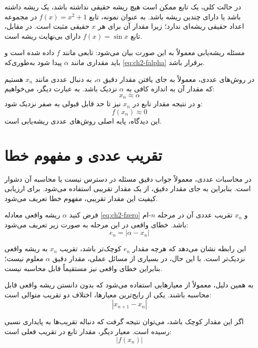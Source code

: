 در حالت کلی، یک تابع ممکن است هیچ ریشه حقیقی نداشته باشد، یک ریشه داشته باشد یا دارای چندین ریشه باشد. به عنوان نمونه، تابع $f(x)=x^2+1$ در مجموعه اعداد حقیقی ریشه‌ای ندارد؛ زیرا مقدار آن برای هر $x$ حقیقی مثبت است. در مقابل، تابع $f(x)=\sin x$ دارای بی‌نهایت ریشه است.

مسئله ریشه‌یابی معمولاً به این صورت بیان می‌شود: تابعی مانند $f$ داده شده است و باید مقداری مانند $\alpha$ پیدا شود به‌طوری‌که \eqref{eq:ch2-falpha} برقرار باشد.

در روش‌های عددی، معمولاً به جای یافتن مقدار دقیق $\alpha$، به دنبال عددی مانند $x_n$ هستیم که مقدار آن به اندازه کافی به $\alpha$ نزدیک باشد. به عبارت دیگر، می‌خواهیم:
\[
x_n \approx \alpha
\]
و در نتیجه مقدار تابع در $x_n$ نیز تا حد قابل قبولی به صفر نزدیک شود:
\[
f(x_n)\approx 0
\]
این دیدگاه، پایه اصلی روش‌های عددی ریشه‌یابی است.

\section{تقریب عددی و مفهوم خطا}

در محاسبات عددی، معمولاً جواب دقیق مسئله در دسترس نیست یا محاسبه آن دشوار است. بنابراین به جای مقدار دقیق، از یک مقدار تقریبی استفاده می‌شود. برای ارزیابی کیفیت این مقدار تقریبی، مفهوم خطا تعریف می‌شود.

فرض کنید $\alpha$ ریشه واقعی معادله \eqref{eq:ch2-fzero} و $x_n$ تقریب عددی آن در مرحله $n$-ام باشد. خطای واقعی در این مرحله به صورت زیر تعریف می‌شود:
\begin{equation}
e_n = |\alpha - x_n|
\label{eq:ch2-abs-error}
\end{equation}

این رابطه نشان می‌دهد که هرچه مقدار $e_n$ کوچک‌تر باشد، تقریب $x_n$ به ریشه واقعی نزدیک‌تر است. با این حال، در بسیاری از مسائل عملی، مقدار دقیق $\alpha$ معلوم نیست؛ بنابراین خطای واقعی نیز مستقیماً قابل محاسبه نیست.

به همین دلیل، معمولاً از معیارهایی استفاده می‌شود که بدون دانستن ریشه واقعی قابل محاسبه باشند. یکی از رایج‌ترین معیارها، اختلاف دو تقریب متوالی است:
\begin{equation}
|x_{n+1}-x_n|
\label{eq:ch2-diff}
\end{equation}

اگر این مقدار کوچک باشد، می‌توان نتیجه گرفت که دنباله تقریب‌ها به پایداری نسبی رسیده است. معیار دیگر، مقدار تابع در تقریب فعلی است:
\begin{equation}
|f(x_n)|
\label{eq:ch2-fval}
\end{equation}

